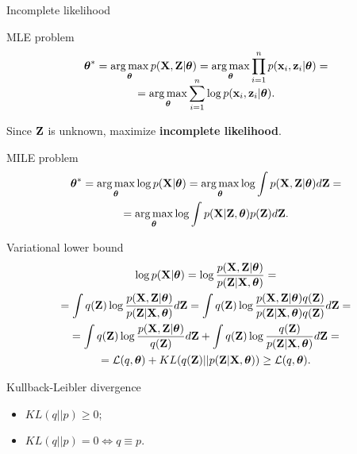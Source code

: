 \begin{frame}{Incomplete likelihood}
        \begin{block}{MLE problem}
            \vspace{-0.3cm}
            \begin{multline*}
                \vspace{-0.3cm}
                \btheta^* = \argmax_{\btheta} p(\bX, \bZ | \btheta) = \argmax_{\btheta} \prod_{i=1}^n p(\bx_i, \bz_i | \btheta) = \\ = \argmax_{\btheta} \sum_{i=1}^n \log p(\bx_i, \bz_i | \btheta).
            \end{multline*}
            \vspace{-0.3cm}
        \end{block}
	Since $\mathbf{Z}$ is unknown, maximize \textbf{incomplete likelihood}.
    \begin{block}{MILE problem}
        \vspace{-0.3cm}
    	\begin{multline*}
        	\boldsymbol{\theta}^* = \operatorname*{arg\,max}_{\boldsymbol{\theta}} \log p(\mathbf{X}| \boldsymbol{\theta}) = \operatorname*{arg\,max}_{\boldsymbol{\theta}} \log \int p(\mathbf{X}, \mathbf{Z} | \boldsymbol{\theta}) d \mathbf{Z} = \\ = \operatorname*{arg\,max}_{\boldsymbol{\theta}} \log \int p(\mathbf{X}| \mathbf{Z}, \boldsymbol{\theta}) p(\mathbf{Z}) d\mathbf{Z}.
    	\end{multline*}
        \vspace{-0.3cm}
	\end{block}
	
\end{frame}
\begin{frame}{Variational lower bound}
	\begin{multline*}
		\log p(\mathbf{X}| \boldsymbol{\theta}) 
		= \log \frac{p(\mathbf{X}, \mathbf{Z}| \boldsymbol{\theta})}{p(\mathbf{Z}|\mathbf{X}, \boldsymbol{\theta})} = \\ 
		= \int q(\mathbf{Z}) \log \frac{p(\mathbf{X}, \mathbf{Z}| \boldsymbol{\theta})}{p(\mathbf{Z}|\mathbf{X}, \boldsymbol{\theta})}d\mathbf{Z}
		= \int q(\mathbf{Z}) \log \frac{p(\mathbf{X}, \mathbf{Z}| \boldsymbol{\theta}) q(\mathbf{Z})}{p(\mathbf{Z}|\mathbf{X}, \boldsymbol{\theta}) q(\mathbf{Z})} d\mathbf{Z} = \\
		= \int q(\mathbf{Z}) \log \frac{p(\mathbf{X}, \mathbf{Z} | \boldsymbol{\theta})}{q(\mathbf{Z})}d\mathbf{Z} + \int q(\mathbf{Z}) \log \frac{q(\mathbf{Z})}{p(\mathbf{Z}|\mathbf{X}, \boldsymbol{\theta})}d\mathbf{Z} = \\ 
		= \mathcal{L} (q, \boldsymbol{\theta}) + KL(q(\mathbf{Z}) || p(\mathbf{Z}|\mathbf{X}, \boldsymbol{\theta})) \geq \mathcal{L} (q, \boldsymbol{\theta}).
	\end{multline*}
	\begin{block}{Kullback-Leibler divergence}
	    \begin{itemize}
	        \item $KL(q || p) \geq 0$;
	        \item $KL(q || p) = 0 \Leftrightarrow q \equiv p$.
	    \end{itemize}
	\end{block}
\end{frame}
